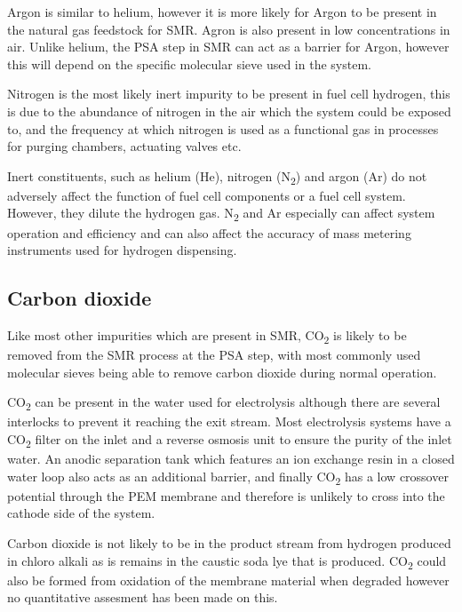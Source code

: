 Argon is similar to helium, however it is more likely for Argon to be present in the natural gas feedstock for SMR. Agron is also present in low concentrations in air. Unlike helium, the PSA step in SMR can act as a barrier for Argon, however this will depend on the specific molecular sieve used in the system. \cite{Bacquart2018}

Nitrogen is the most likely inert impurity to be present in fuel cell hydrogen, this is due to the abundance of nitrogen in the air which the system could be exposed to, and the frequency at which nitrogen is used as a functional gas in processes for purging chambers, actuating valves etc.

Inert constituents, such as helium (He), nitrogen (N\textsubscript{2}) and argon (Ar) do not adversely affect the function of fuel cell components or a fuel cell system. However, they dilute the hydrogen gas. N\textsubscript{2} and Ar especially can affect system operation and efficiency and can also affect the accuracy of mass metering instruments used for hydrogen dispensing. \cite{InternationalStandardISO14687-2:20122012}

\subsection*{Carbon dioxide} 
Like most other impurities which are present in SMR, CO\textsubscript{2} is likely to be removed from the SMR process at the PSA step, with most commonly used molecular sieves being able to remove carbon dioxide during normal operation. \cite{Muradov2015} 

CO\textsubscript{2} can be present in the water used for electrolysis although there are several interlocks to prevent it reaching the exit stream. Most electrolysis systems have a CO\textsubscript{2} filter on the inlet and a reverse osmosis unit to ensure the purity of the inlet water. An anodic separation tank which features an ion exchange resin in a closed water loop also acts as an additional barrier, and finally CO\textsubscript{2} has a low crossover potential through the PEM membrane and therefore is unlikely to cross into the cathode side of the system.\cite{Bacquart2018}

Carbon dioxide is not likely to be in the product stream from hydrogen produced in chloro alkali as is remains in the caustic soda lye that is produced. CO\textsubscript{2} could also be formed from oxidation of the membrane material when degraded however no quantitative assesment has been made on this. \cite{Bacquart2018}

